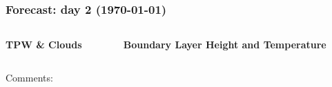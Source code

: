 \documentclass[aspectratio=169, 10pt]{beamer}
\begin{document}
\begin{frame}
\frametitle{Forecast: day 2 ({\AdvanceDate[+2]\today})}

\vspace{-.3cm}
\begin{columns}
\begin{column}{0.5\textwidth}
\begin{center}
\textbf{TPW \& Clouds}\\
\end{center}
\end{column}

\begin{column}{0.5\textwidth}
\begin{center}
\textbf{Boundary Layer Height and Temperature} \\
\end{center}
\end{column}
\end{columns}

\begin{figure}


\end{figure}

Comments:
\vspace{4cm}


\end{frame}
\end{document}

